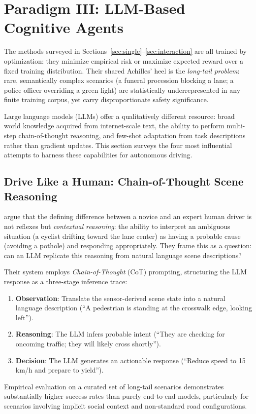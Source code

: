 \documentclass[12pt, a4paper]{article}
\begin{document}
\section{Paradigm III: LLM-Based Cognitive Agents}
\label{sec:cognitive}

The methods surveyed in Sections~\ref{sec:single}--\ref{sec:interaction} are all
trained by optimization: they minimize empirical risk or maximize expected reward
over a fixed training distribution. Their shared Achilles' heel is the
\emph{long-tail problem}: rare, semantically complex scenarios (a funeral
procession blocking a lane; a police officer overriding a green light) are
statistically underrepresented in any finite training corpus, yet carry
disproportionate safety significance.

Large language models (LLMs) offer a qualitatively different resource: broad world
knowledge acquired from internet-scale text, the ability to perform multi-step
chain-of-thought reasoning, and few-shot adaptation from task descriptions rather
than gradient updates. This section surveys the four most influential attempts to
harness these capabilities for autonomous driving.

\subsection{Drive Like a Human: Chain-of-Thought Scene Reasoning}
\label{sec:dlh}

\citet{fu2023drive} argue that the defining difference between a novice and an
expert human driver is not reflexes but \emph{contextual reasoning}: the ability
to interpret an ambiguous situation (a cyclist drifting toward the lane center)
as having a probable cause (avoiding a pothole) and responding appropriately.
They frame this as a question: can an LLM replicate this reasoning from natural
language scene descriptions?

Their system employs \emph{Chain-of-Thought} (CoT) prompting, structuring the LLM
response as a three-stage inference trace:
\begin{enumerate}[noitemsep]
  \item \textbf{Observation}: Translate the sensor-derived scene state into a
        natural language description (``A pedestrian is standing at the crosswalk
        edge, looking left'').
  \item \textbf{Reasoning}: The LLM infers probable intent
        (``They are checking for oncoming traffic; they will likely cross shortly'').
  \item \textbf{Decision}: The LLM generates an actionable response
        (``Reduce speed to 15\,km/h and prepare to yield'').
\end{enumerate}
Empirical evaluation on a curated set of long-tail scenarios demonstrates
substantially higher success rates than purely end-to-end models, particularly for
scenarios involving implicit social context and non-standard road configurations.
\end{document}

